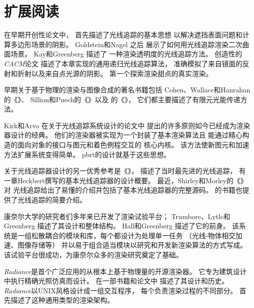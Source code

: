 \section{扩展阅读}\label{sec:扩展阅读1}

在早期开创性论文中，
\citet{10.1145/1468075.1468082}首先描述了光线追踪的基本思想
以解决遮挡表面问题和计算多边形场景的阴影。
Goldstein和Nagel \parencite*{doi:10.1177/003754977101600104}之后
展示了如何用光线追踪渲染二次曲面场景。
Kay和Greenberg \parencite*{10.1145/800249.807438}描述了
一种渲染透明度的光线追踪方法。
\citet{10.1145/358876.358882}创造性的\emph{CACM}论文
描述了本章实现的通用递归光线追踪算法，
准确模拟了来自镜面的反射和折射以及来自点光源的阴影。
\citet{10.1145/37402.37411}第一个探索渲染甜点的真实渲染。

早期关于基于物理的渲染与图像合成的著名书籍包括
Cohen、Wallace和Hanrahan的《》\parencite*{10.5555/154731}、
Sillion和Puech的《》\parencite*{10.5555/561383}以及
\citeauthor{10.5555/200607}的《》\parencite*{10.5555/200607}，
它们都主要描述了有限元光能传递方法。

Kirk和Arvo \parencite*{Kirk88theray}在关于光线追踪系统设计的论文中
提出的许多原则如今已经成为渲染器设计的经典。
他们的渲染器被实现为一个封装了基本渲染算法且
能通过精心构造的面向对象的接口与图元和着色例程交互的
核心内核。
该方法使新图元和加速方法扩展系统变得简单。
pbrt的设计就基于这些思想。

关于光线追踪器设计的另一优秀参考是《》\citep{10.5555/94788}，
描述了当时最先进的光线追踪，
有一章Heckbert撰写的基本光线追踪器的设计概要。
最近，Shirley和Morley的《》\parencite*{10.5555/940410}对
光线追踪给出了易懂的介绍并包括了基本光线追踪器的完整源码。
\citet{10.5555/1324795}的书籍也提供了光线追踪的简要介绍。

康奈尔大学的研究者们多年来已开发了渲染试验平台；
Trumbore、Lytle和Greenberg \parencite*{egtp.19911035}
描述了其设计和整体结构。
Hall和Greenberg \parencite*{4037684}描述了它的前身。
该系统是一组松散耦合的模块和库，每个都设计为处理单一任务
（光线-物体相交加速、图像存储等）
并以易于组合适当模块以研究和开发新渲染算法的方式写成。
该试验平台很成功，为康奈尔众多的渲染研究奠定了基础。

\emph{Radiance}是首个广泛应用的从根本上基于物理量的开源渲染器。
它专为建筑设计中执行精确光照仿真而设计。
\citeauthor{10.1145/192161.192286}在一部书籍和论文中
\citep{10.1145/192161.192286,10.5555/286090}描述了其设计和历史。
\emph{Radiance}以UNIX风格设计成一组交互程序，
每个负责渲染过程的不同部分。
\citet{10.1145/325334.325174}首先描述了这种通用类型的渲染架构。

